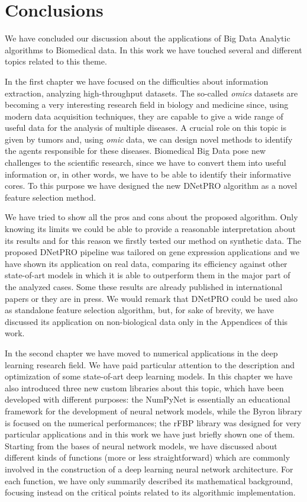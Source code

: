 \documentclass{standalone}
\begin{document}
\chapter*{Conclusions}\label{conclusions}

We have concluded our discussion about the applications of Big Data Analytic algorithms to Biomedical data.
In this work we have touched several and different topics related to this theme.

In the first chapter we have focused on the difficulties about information extraction, analyzing high-throughput datasets.
The so-called \emph{omics} datasets are becoming a very interesting research field in biology and medicine since, using modern data acquisition techniques, they are capable to give a wide range of useful data for the analysis of multiple diseases.
A crucial role on this topic is given by tumors and, using \emph{omic} data, we can design novel methods to identify the agents responsible for these diseases.
Biomedical Big Data pose new challenges to the scientific research, since we have to convert them into useful information or, in other words, we have to be able to identify their informative cores.
To this purpose we have designed the new \textsf{DNetPRO} algorithm as a novel feature selection method.

We have tried to show all the pros and cons about the proposed algorithm.
Only knowing its limits we could be able to provide a reasonable interpretation about its results and for this reason we firstly tested our method on synthetic data.
The proposed \textsf{DNetPRO} pipeline was tailored on gene expression applications and we have shown its application on real data, comparing its efficiency against other state-of-art models in which it is able to outperform them in the major part of the analyzed cases.
Some these results are already published in international papers or they are in press.
We would remark that \textsf{DNetPRO} could be used also as standalone feature selection algorithm, but, for sake of brevity, we have discussed its application on non-biological data only in the Appendices of this work.

In the second chapter we have moved to numerical applications in the deep learning research field.
We have paid particular attention to the description and optimization of some state-of-art deep learning models.
In this chapter we have also introduced three new custom libraries about this topic, which have been developed with different purposes: the \textsf{NumPyNet} is essentially an educational framework for the development of neural network models, while the \textsf{Byron} library is focused on the numerical performances; the \textsf{rFBP} library was designed for very particular applications and in this work we have just briefly shown one of them.
Starting from the bases of neural network models, we have discussed about different kinds of functions (more or less straightforward) which are commonly involved in the construction of a deep learning neural network architecture.
For each function, we have only summarily described its mathematical background, focusing instead on the critical points related to its algorithmic implementation.
\end{document}
